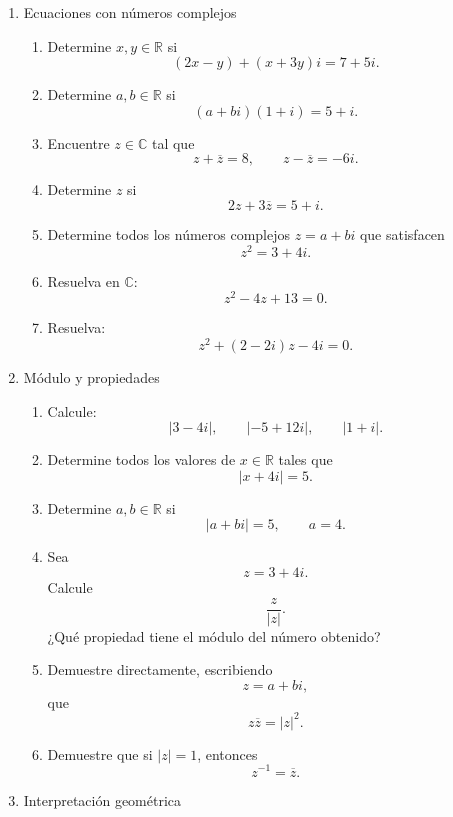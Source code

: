 \documentclass[12pt]{article}
\begin{document}
\begin{enumerate}
\item Ecuaciones con números complejos

\begin{enumerate}

\item Determine $x,y\in\mathbb{R}$ si
\[
(2x-y)+(x+3y)i=7+5i.
\]

\item Determine $a,b\in\mathbb{R}$ si
\[
(a+bi)(1+i)=5+i.
\]

\item Encuentre $z\in\mathbb{C}$ tal que
\[
z+\overline z=8,
\qquad
z-\overline z=-6i.
\]

\item Determine $z$ si
\[
2z+3\overline z=5+i.
\]

\item Determine todos los números complejos $z=a+bi$ que satisfacen
\[
z^2=3+4i.
\]

\item Resuelva en $\mathbb{C}$:
\[
z^2-4z+13=0.
\]

\item Resuelva:
\[
z^2+(2-2i)z-4i=0.
\]

\end{enumerate}


\item Módulo y propiedades

\begin{enumerate}

\item Calcule:
\[
|3-4i|,
\qquad
|-5+12i|,
\qquad
|1+i|.
\]

\item Determine todos los valores de $x\in\mathbb{R}$ tales que
\[
|x+4i|=5.
\]

\item Determine $a,b\in\mathbb{R}$ si
\[
|a+bi|=5,
\qquad a=4.
\]

\item Sea
\[
z=3+4i.
\]
Calcule
\[
\frac{z}{|z|}.
\]
¿Qué propiedad tiene el módulo del número obtenido?

\item Demuestre directamente, escribiendo
\[
z=a+bi,
\]
que
\[
z\overline z=|z|^2.
\]

\item Demuestre que si $|z|=1$, entonces
\[
z^{-1}=\overline z.
\]

\end{enumerate}


\item Interpretación geométrica


\end{enumerate}
\end{document}
